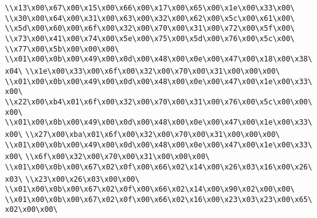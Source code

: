 \verb|\\x13\x00\x67\x00\x15\x00\x66\x00\x17\x00\x65\x00\x1e\x00\x33\x00\|\newline
\verb|\\x30\x00\x64\x00\x31\x00\x63\x00\x32\x00\x62\x00\x5c\x00\x61\x00\|\newline
\verb|\\x5d\x00\x60\x00\x6f\x00\x32\x00\x70\x00\x31\x00\x72\x00\x5f\x00\|\newline
\verb|\\x73\x00\x41\x00\x74\x00\x5e\x00\x75\x00\x5d\x00\x76\x00\x5c\x00\|\newline
\verb|\\x77\x00\x5b\x00\x00\x00\|\newline
\verb|\\x01\x00\x0b\x00\x49\x00\x0d\x00\x48\x00\x0e\x00\x47\x00\x18\x00\x38\x04\|\newline
\verb|\\x1e\x00\x33\x00\x6f\x00\x32\x00\x70\x00\x31\x00\x00\x00\|\newline
\verb|\\x01\x00\x0b\x00\x49\x00\x0d\x00\x48\x00\x0e\x00\x47\x00\x1e\x00\x33\x00\|\newline
\verb|\\x22\x00\xb4\x01\x6f\x00\x32\x00\x70\x00\x31\x00\x76\x00\x5c\x00\x00\x00\|\newline
\verb|\\x01\x00\x0b\x00\x49\x00\x0d\x00\x48\x00\x0e\x00\x47\x00\x1e\x00\x33\x00\|\newline
\verb|\\x27\x00\xba\x01\x6f\x00\x32\x00\x70\x00\x31\x00\x00\x00\|\newline
\verb|\\x01\x00\x0b\x00\x49\x00\x0d\x00\x48\x00\x0e\x00\x47\x00\x1e\x00\x33\x00\|\newline
\verb|\\x6f\x00\x32\x00\x70\x00\x31\x00\x00\x00\|\newline
\verb|\\x01\x00\x0b\x00\x67\x02\x0f\x00\x66\x02\x14\x00\x26\x03\x16\x00\x26\x03\|\newline
\verb|\\x23\x00\x26\x03\x00\x00\|\newline
\verb|\\x01\x00\x0b\x00\x67\x02\x0f\x00\x66\x02\x14\x00\x90\x02\x00\x00\|\newline
\verb|\\x01\x00\x0b\x00\x67\x02\x0f\x00\x66\x02\x16\x00\x23\x03\x23\x00\x65\x02\x00\x00\|\newline
